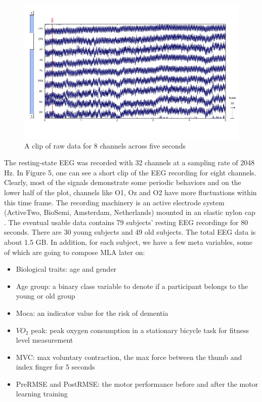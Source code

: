 \documentclass[a4paper,11pt,oneside]{article}
\begin{document}
\begin{figure}[h]
	\centering
	\includegraphics[width=1.0\textwidth]{img/visu}
	\caption{A clip of raw data for 8 channels across five seconds}
\end{figure}

  The resting-state EEG was recorded with 32 channels at a sampling rate of 2048 Hz. In Figure 5, one can see a short clip of the EEG recording for eight channels. Clearly, most of the signals demonstrate some periodic behaviors and on the lower half of the plot, channels like O1, Oz and O2 have more fluctuations within this time frame.  The recording machinery is an active electrode system (ActiveTwo, BioSemi, Amsterdam, Netherlands) mounted in an elastic nylon cap \cite{jasper1958ten}. The eventual usable data contains 79 subjects' resting EEG recordings for 80 seconds. There are 30 young subjects and 49 old subjects. The total EEG data is about 1.5 GB. In addition, for each subject, we have a few meta variables, some of which are going to compose MLA later on:
\begin{itemize}
	\item Biological traits: age and gender
	\item Age group: a binary class variable to denote if a participant belongs to the young or old group
	\item Moca: an indicator value for the risk of dementia
	\item $VO_2$ peak: peak oxygen consumption in a stationary bicycle task for fitness level measurement
	 \item MVC: max voluntary contraction, the max force between the thumb and index finger for 5 seconds 
	 \item PreRMSE and PostRMSE: the motor performance before and after the motor learning training
\end{itemize}
\end{document}
